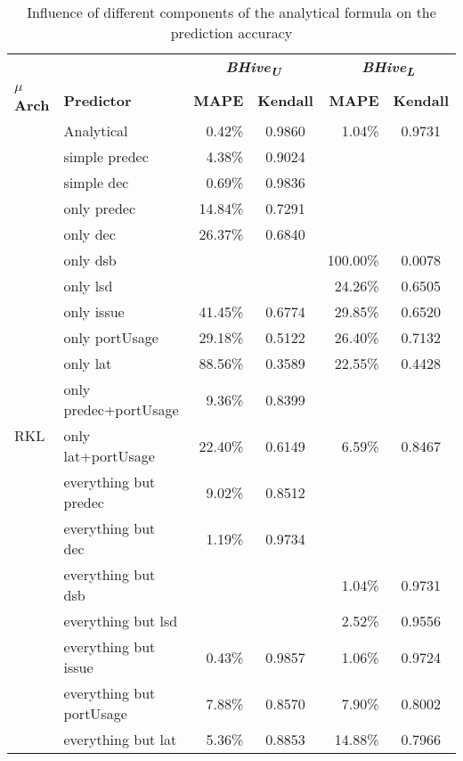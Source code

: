 \documentclass[sigconf,nonacm]{acmart}
\newcommand{\bhivel}{\emph{BHive\textsubscript{L}}\xspace}
\newcommand{\bhiveu}{\emph{BHive\textsubscript{U}}\xspace}
\begin{document}
\begin{table}
\caption{Influence of different components of the analytical formula on the prediction accuracy}
\begin{center}
\begin{tabular}{llrcrc}
\toprule
& & \multicolumn{2}{c}{\textbf{\bhiveu}} & \multicolumn{2}{c}{\textbf{\bhivel}}\\  \cmidrule(lr){3-4}\cmidrule(lr){5-6}
\textbf{{$\mu$}Arch}  & \textbf{Predictor} & \textbf{MAPE} & \textbf{Kendall} & \textbf{MAPE} & \textbf{Kendall} \\
\midrule
\multirow{19}{*}{RKL} & Analytical & 0.42\% & 0.9860 & 1.04\% & 0.9731\\
                      & simple predec  & 4.38\% & 0.9024 & & \\
                      & simple dec  & 0.69\% & 0.9836 & & \\
                      & only predec  & 14.84\% & 0.7291 & & \\
                      & only dec  & 26.37\% & 0.6840 & & \\
                      & only dsb  & & & 100.00\% & 0.0078\\
                      & only lsd  & & & 24.26\% & 0.6505\\
                      & only issue  & 41.45\% & 0.6774 & 29.85\% & 0.6520\\
                      & only portUsage  & 29.18\% & 0.5122 & 26.40\% & 0.7132\\
                      & only lat  & 88.56\% & 0.3589 & 22.55\% & 0.4428\\
                      & only predec+portUsage  & 9.36\% & 0.8399 & & \\
                      & only lat+portUsage  & 22.40\% & 0.6149 & 6.59\% & 0.8467\\
                      & everything but predec  & 9.02\% & 0.8512 & & \\
                      & everything but dec  & 1.19\% & 0.9734 & & \\
                      & everything but dsb  & & & 1.04\% & 0.9731\\
                      & everything but lsd  & & & 2.52\% & 0.9556\\
                      & everything but issue  & 0.43\% & 0.9857 & 1.06\% & 0.9724\\
                      & everything but portUsage  & 7.88\% & 0.8570 & 7.90\% & 0.8002\\
                      & everything but lat  & 5.36\% & 0.8853 & 14.88\% & 0.7966\\

\end{tabular}
\end{center}
\end{table}
\end{document}
